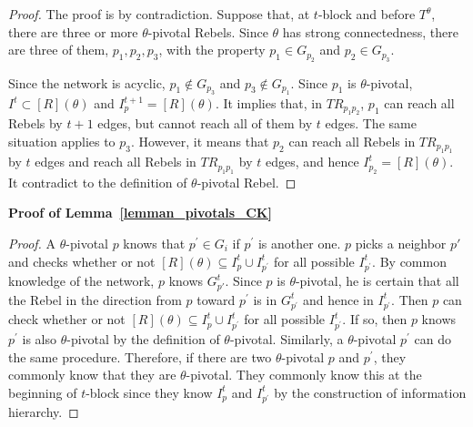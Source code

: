 \documentclass[12pt,letter]{article}
\newtheorem*{lemma*}{Lemma}
\theoremstyle{definition}
\theoremstyle{remark}
\theoremstyle{claim}
\begin{document}
\begin{proof}
The proof is by contradiction. Suppose that, at $t$-block and before $T^{\theta}$, there are three or more $\theta$-pivotal Rebels. Since $\theta$ has strong connectedness, there are three of them, $p_1,p_2,p_3$, with the property $p_1\in G_{p_2}$ and $p_2 \in G_{p_3}$. 

Since the network is acyclic, $p_1\notin G_{p_3}$ and $p_3\notin G_{p_1}$. Since $p_1$ is $\theta$-pivotal, $I^t\subset [R](\theta)$ and $I^{t+1}_p=[R](\theta)$. It implies that, in $TR_{p_1p_2}$, $p_1$ can reach all Rebels by $t+1$ edges, but cannot reach all of them by $t$ edges. The same situation applies to $p_3$. However, it means that $p_2$ can reach all Rebels in $TR_{p_1p_1}$ by $t$ edges and reach all Rebels in $TR_{p_1p_1}$ by $t$ edges, and hence $I^t_{p_2}=[R](\theta)$. It contradict to the definition of $\theta$-pivotal Rebel.

\end{proof}



\bigskip
\noindent\textbf{Proof of Lemma~\ref{lemman_pivotals_CK}}
\begin{proof}
A $\theta$-pivotal $p$ knows that $p^{'}\in G_i$ if $p^{'}$ is another one. $p$ picks a neighbor $p'$ and checks whether or not $[R](\theta)\subseteq I^t_{p}\cup I^t_{p^{'}}$ for all possible $I^t_{p^{'}}$. By common knowledge of the network, $p$ knows $G^t_{p{'}}$. Since $p$ is $\theta$-pivotal, he is certain that all the Rebel in the direction from $p$ toward $p^{'}$ is in $G^t_{p^{'}}$ and hence in $I^t_{p^{'}}$. Then $p$ can check whether or not $[R](\theta)\subseteq I^t_{p}\cup I^t_{p^{'}}$ for all possible $I^t_{p^{'}}$. If so, then $p$ knows $p^{'}$ is also $\theta$-pivotal by the definition of $\theta$-pivotal. Similarly, a $\theta$-pivotal $p^{'}$ can do the same procedure. Therefore, if there are two $\theta$-pivotal $p$ and $p^{'}$, they commonly know that they are $\theta$-pivotal. They commonly know this at the beginning of $t$-block since they know $I^t_{p}$ and $I^t_{p^{'}}$ by the construction of information hierarchy.
\end{proof}
\end{document}
